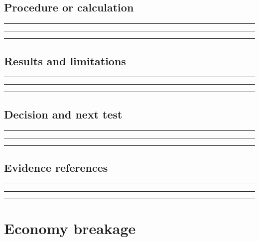 \documentclass[11pt]{article}
\begin{document}
\subsection{Procedure or calculation}
\noindent\rule{\linewidth}{0.35pt}\par\vspace{0.22in}
\noindent\rule{\linewidth}{0.35pt}\par\vspace{0.22in}
\noindent\rule{\linewidth}{0.35pt}\par\vspace{0.18in}

\subsection{Results and limitations}
\noindent\rule{\linewidth}{0.35pt}\par\vspace{0.22in}
\noindent\rule{\linewidth}{0.35pt}\par\vspace{0.22in}
\noindent\rule{\linewidth}{0.35pt}\par\vspace{0.18in}

\subsection{Decision and next test}
\noindent\rule{\linewidth}{0.35pt}\par\vspace{0.22in}
\noindent\rule{\linewidth}{0.35pt}\par\vspace{0.22in}
\noindent\rule{\linewidth}{0.35pt}\par\vspace{0.18in}

\subsection{Evidence references}
\noindent\rule{\linewidth}{0.35pt}\par\vspace{0.22in}
\noindent\rule{\linewidth}{0.35pt}\par\vspace{0.22in}
\noindent\rule{\linewidth}{0.35pt}\par\vspace{0.18in}
\clearpage

\section{Economy breakage}
\end{document}
